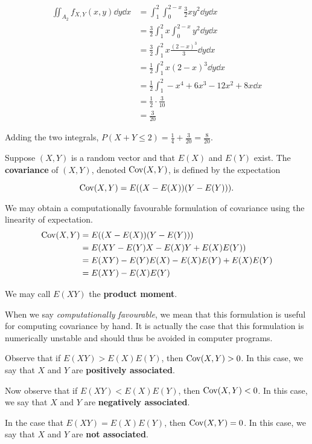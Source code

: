 \begin{example}[]
	\begin{align*}
		\iint_{A_2}f_{X,Y}(x,y)\dd y\dd x&=\int_1^2\int_{0}^{2-x}\frac 32xy^2\dd y\dd x\\
		&=\frac 32\int_1^2x\int_{0}^{2-x}y^2\dd y\dd x\\
		&=\frac 32\int_1^2x\frac{(2-x)^3}{3}\dd y\dd x\\
		&=\frac 12\int_1^2x (2-x)^3\dd y\dd x\\
		&=\frac 12\int_1^2-x^4+6x^3-12x^2+8x\dd x\\
		&=\frac 12\cdot\frac 3{10}\\
		&=\frac 3{20}
	\end{align*}

	Adding the two integrals, $P(X+Y\leq 2)=\frac 14+\frac 3{20}=\frac 8{20}$.
\end{example}

\begin{definition}[covariance]
	Suppose $(X,Y)$ is a random vector and that $E(X)$ and $E(Y)$ exist. The \textbf{covariance} of $(X,Y)$, denoted $\operatorname{Cov}(X,Y)$, is defined by the expectation

	$$\operatorname{Cov}(X,Y)=E((X-E(X))(Y-E(Y))).$$
\end{definition}

We may obtain a computationally favourable formulation of covariance using the linearity of expectation.
\begin{align*}
	\operatorname{Cov}(X,Y)&=E((X-E(X))(Y-E(Y)))\\
	&=E(XY-E(Y)X-E(X)Y+E(X)E(Y))\\
	&=E(XY)-E(Y)E(X)-E(X)E(Y)+E(X)E(Y)\\
	&=E(XY)-E(X)E(Y)
\end{align*}

We may call $E(XY)$ the \textbf{product moment}.

When we say \textit{computationally favourable}, we mean that this formulation is useful for computing covariance by hand. It is actually the case that this formulation is numerically unstable and should thus be avoided in computer programs.

Observe that if $E(XY)>E(X)E(Y)$, then $\operatorname{Cov}(X,Y)>0$. In this case, we say that $X$ and $Y$ are \textbf{positively associated}.

Now observe that if $E(XY)<E(X)E(Y)$, then $\operatorname{Cov}(X,Y)<0$. In this case, we say that $X$ and $Y$ are \textbf{negatively associated}.

In the case that $E(XY)=E(X)E(Y)$, then $\operatorname{Cov}(X,Y)=0$. In this case, we say that $X$ and $Y$ are \textbf{not associated}.

